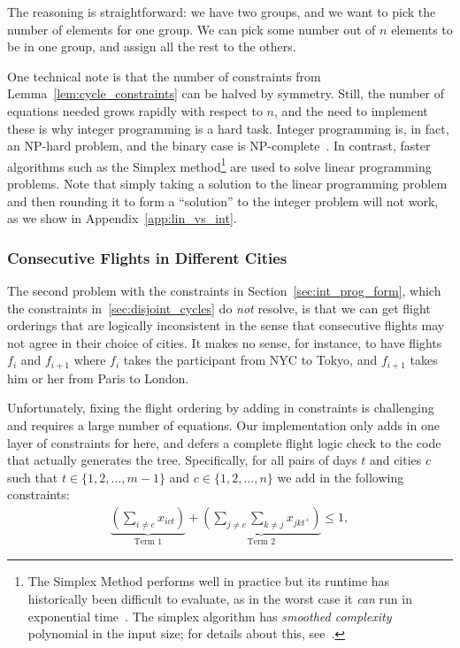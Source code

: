 \documentclass{article}
\begin{document}
The reasoning is straightforward: we have two groups, and we want to pick the number of elements for one group. We can pick some number out of $n$
elements to be in one group, and assign all the rest to the others.

One technical note is that the number of constraints from Lemma~\ref{lem:cycle_constraints} can be halved by symmetry. Still, the number of equations
needed grows rapidly with respect to $n$, and the need to implement these is why integer programming is a hard task. Integer programming is, in fact,
an NP-hard problem, and the binary case is NP-complete~\cite{Kar72}. In contrast, faster algorithms such as the Simplex method\footnote{The Simplex
Method performs well in practice but its runtime has historically been difficult to evaluate, as in the worst case it \emph{can} run in exponential
time~\cite{Klee1972}. The simplex algorithm has \emph{smoothed complexity} polynomial in the input size; for details about this,
see~\cite{Spielman:2004:SAA:990308.990310}.} are used to solve linear programming problems. Note that simply taking a solution to the linear
programming problem and then rounding it to form a ``solution'' to the integer problem will not work, as we show in Appendix~\ref{app:lin_vs_int}.

\subsubsection{Consecutive Flights in Different Cities}

The second problem with the constraints in Section~\ref{sec:int_prog_form}, which the constraints in~\ref{sec:disjoint_cycles} do \emph{not} resolve,
is that we can get flight orderings that are logically inconsistent in the sense that consecutive flights may not agree in their choice of cities. It
makes no sense, for instance, to have flights $f_i$ and $f_{i+1}$ where $f_i$ takes the participant from NYC to Tokyo, and $f_{i+1}$ takes him or her
from Paris to London.

Unfortunately, fixing the flight ordering by adding in constraints is challenging and requires a large number of equations. Our implementation only
adds in one layer of constraints for here, and defers a complete flight logic check to the code that actually generates the tree. Specifically, for
all pairs of days $t$ and cities $c$ such that $t \in \{1,2,\ldots, m-1\}$ and $c \in \{1,2,\ldots,n\}$ we add in the following constraints:
\begin{align}
\underbrace{\left(\sum_{i\ne c} x_{ict} \right)}_{\text{Term 1}} + \underbrace{\left( \sum_{j\ne c}\sum_{k\ne j} x_{jkt^+}\right)}_{\text{Term 2}} \le 1,
\end{align}
\end{document}
